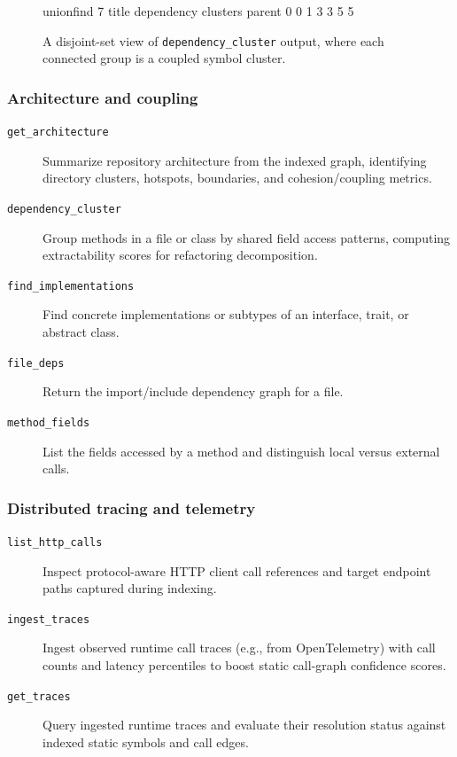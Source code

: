 \begin{figure}[htbp]
  \centering
\begin{triton}
unionfind 7
  title dependency clusters
  parent 0 0 1 3 3 5 5
\end{triton}
  \caption{A disjoint-set view of \texttt{dependency\_cluster} output, where
           each connected group is a coupled symbol cluster.}
  \label{fig:dependency-clusters}
\end{figure}

\subsubsection{Architecture and coupling}

\begin{description}
  \item[\texttt{get\_architecture}] Summarize repository architecture from the
        indexed graph, identifying directory clusters, hotspots, boundaries,
        and cohesion/coupling metrics.
  \item[\texttt{dependency\_cluster}] Group methods in a file or class by
        shared field access patterns, computing extractability scores for
        refactoring decomposition.
  \item[\texttt{find\_implementations}] Find concrete implementations or
        subtypes of an interface, trait, or abstract class.
  \item[\texttt{file\_deps}] Return the import/include dependency graph for a
        file.
  \item[\texttt{method\_fields}] List the fields accessed by a method and
        distinguish local versus external calls.
\end{description}

\subsubsection{Distributed tracing and telemetry}

\begin{description}
  \item[\texttt{list\_http\_calls}] Inspect protocol-aware HTTP client call
        references and target endpoint paths captured during indexing.
  \item[\texttt{ingest\_traces}] Ingest observed runtime call traces (e.g., from
        OpenTelemetry) with call counts and latency percentiles to boost static
        call-graph confidence scores.
  \item[\texttt{get\_traces}] Query ingested runtime traces and evaluate their
        resolution status against indexed static symbols and call edges.
\end{description}

